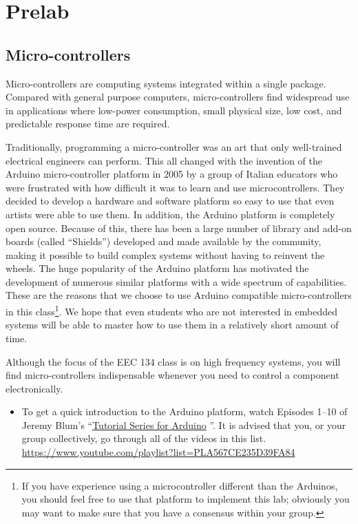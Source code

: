 \documentclass[letterpaper, 11pt]{article}
\begin{document}
\newpage
\section{Prelab}
\subsection{Micro-controllers}
Micro-controllers are computing systems integrated within a single package. Compared with general purpose computers, micro-controllers find widespread use in applications where low-power consumption, small physical size, low cost, and predictable response time are required. 

Traditionally, programming a micro-controller was an art that only well-trained electrical engineers can perform. This all changed with the invention of the Arduino micro-controller platform in 2005 by a group of Italian educators who were frustrated with how difficult it was to learn and use microcontrollers. They decided to develop a hardware and software platform so easy to use that even artists were able to use them. In addition, the Arduino platform is completely open source. Because of this, there has been a large number of library and add-on boards (called ``Shields'') developed and made available by the community, making it possible to build complex systems without having to reinvent the wheels. The huge popularity of the Arduino platform has motivated the development of numerous similar platforms with a wide spectrum of capabilities. These are the reasons that we choose to use Arduino compatible micro-controllers in this class\footnote{If you have experience using a microcontroller different than the Arduinos, you should feel free to use that platform to implement this lab; obviously you may want to make sure that you have a consensus within your group.}. We hope that even students who are not interested in embedded systems will be able to master how to use them in a relatively short amount of time. 

Although the focus of the EEC 134 class is on high frequency systems, you will find micro-controllers indispensable whenever you need to control a component electronically.  

\begin{itemize}[itemsep=0.1ex]
	\item To get a quick introduction to the Arduino platform, watch Episodes 1--10 of Jeremy Blum’s ``\href{https://www.youtube.com/playlist?list=PLA567CE235D39FA84}{Tutorial Series for Arduino} ''. It is advised that you, or your group collectively, go through all of the videos in this list. 	\url{https://www.youtube.com/playlist?list=PLA567CE235D39FA84}
	
\end{itemize}
\end{document}
